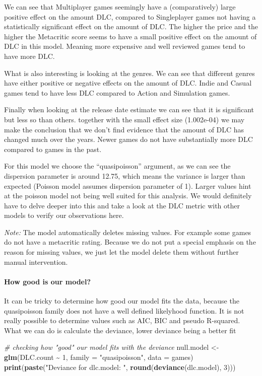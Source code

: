 \documentclass[
]{article}
\newenvironment{Shaded}{\begin{snugshade}}{\end{snugshade}}
\newcommand{\AttributeTok}[1]{\textcolor[rgb]{0.13,0.29,0.53}{#1}}
\newcommand{\CommentTok}[1]{\textcolor[rgb]{0.56,0.35,0.01}{\textit{#1}}}
\newcommand{\DecValTok}[1]{\textcolor[rgb]{0.00,0.00,0.81}{#1}}
\newcommand{\FunctionTok}[1]{\textcolor[rgb]{0.13,0.29,0.53}{\textbf{#1}}}
\newcommand{\NormalTok}[1]{#1}
\newcommand{\OtherTok}[1]{\textcolor[rgb]{0.56,0.35,0.01}{#1}}
\newcommand{\SpecialCharTok}[1]{\textcolor[rgb]{0.81,0.36,0.00}{\textbf{#1}}}
\newcommand{\StringTok}[1]{\textcolor[rgb]{0.31,0.60,0.02}{#1}}
\begin{document}
We can see that Multiplayer games seemingly have a (comparatively) large
positive effect on the amount DLC, compared to Singleplayer games not
having a statistically significant effect on the amount of DLC. The
higher the price and the higher the Metacritic score seems to have a
small positive effect on the amount of DLC in this model. Meaning more
expensive and well reviewed games tend to have more DLC.

What is also interesting is looking at the genres. We can see that
different genres have either positive or negative effects on the amount
of DLC. Indie and Casual games tend to have less DLC compared to Action
and Simulation games.

Finally when looking at the release date estimate we can see that it is
significant but less so than others. together with the small effect size
(1.002e-04) we may make the conclusion that we don't find evidence that
the amount of DLC has changed much over the years. Newer games do not
have substantially more DLC compared to games in the past.

For this model we choose the ``quasipoisson'' argument, as we can see
the dispersion parameter is around 12.75, which means the variance is
larger than expected (Poisson model assumes dispersion parameter of 1).
Larger values hint at the poisson model not being well suited for this
analysis. We would definitely have to delve deeper into this and take a
look at the DLC metric with other models to verify our observations
here.

\emph{Note:} The model automatically deletes missing values. For example
some games do not have a metacritic rating. Because we do not put a
special emphasis on the reason for missing values, we just let the model
delete them without further manual intervention.

\hypertarget{how-good-is-our-model}{%
\paragraph{How good is our model?}\label{how-good-is-our-model}}

It can be tricky to determine how good our model fits the data, because
the quasipoisson family does not have a well defined likelyhood
function. It is not really possible to determine values such as AIC, BIC
and pseudo R-squared. What we can do is calculate the deviance, lower
deviance being a better fit

\begin{Shaded}
\begin{Highlighting}[]
\CommentTok{\# checking how "good" our model fits with the deviance}
\NormalTok{null.model }\OtherTok{\textless{}{-}} \FunctionTok{glm}\NormalTok{(DLC.count }\SpecialCharTok{\textasciitilde{}} \DecValTok{1}\NormalTok{, }\AttributeTok{family =} \StringTok{"quasipoisson"}\NormalTok{, }\AttributeTok{data =}\NormalTok{ games)}
\FunctionTok{print}\NormalTok{(}\FunctionTok{paste}\NormalTok{(}\StringTok{"Deviance for dlc.model: "}\NormalTok{, }\FunctionTok{round}\NormalTok{(}\FunctionTok{deviance}\NormalTok{(dlc.model), }\DecValTok{3}\NormalTok{)))}
\end{Highlighting}
\end{Shaded}
\end{document}
